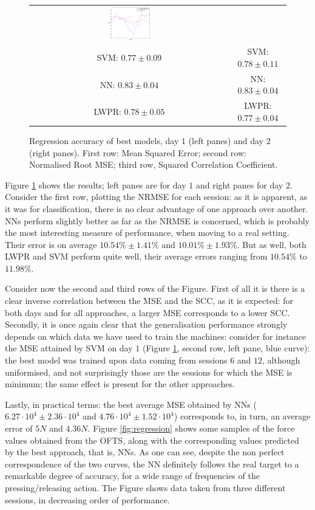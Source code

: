 \begin{figure}[!ht]
\begin{tabular}{cc}
    \includegraphics[width=0.22\textwidth]{figs/fig_SCC_regr_resCrossBestOnDay2} \\
     SVM: $0.77 \pm 0.09$ &  SVM: $0.78 \pm 0.11$ \\
      NN: $0.83 \pm 0.04$ &   NN: $0.83 \pm 0.04$ \\
    LWPR: $0.78 \pm 0.05$ & LWPR: $0.77 \pm 0.04$ \\
  \end{tabular}
  \caption{Regression accuracy of best models, day $1$ (left panes)
    and day $2$ (right panes). First row: Mean Squared Error; second
    row: Normalised Root MSE; third row, Squared Correlation Coefficient.}
  \label{fig:best_regr}
\end{figure}

Figure \ref{fig:best_regr} shows the results; left panes are for day
$1$ and right panes for day $2$. Consider the first row, plotting the
NRMSE for each session: as it is apparent, as it was for
classification, there is no clear advantage of one approach over
another. NNs perform slightly better as far as the NRMSE is concerned,
which is probably the most interesting measure of performance, when
moving to a real setting. Their error is on average $10.54\% \pm
1.41\%$ and $10.01\% \pm 1.93\%$. But as well, both LWPR and SVM
perform quite well, their average errors ranging from $10.54\%$ to
$11.98\%$.

Consider now the second and third rows of the Figure. First of all it
is there is a clear inverse correlation between the MSE and the SCC,
as it is expected: for both days and for all approaches, a larger MSE
corresponds to a lower SCC. Secondly, it is once again clear that the
generalisation performance strongly depends on which data we have used
to train the machines: consider for instance the MSE attained by SVM
on day $1$ (Figure \ref{fig:best_regr}, second row, left pane, blue
curve): the best model was trained upon data coming from sessions $6$
and $12$, although uniformised, and not surprisingly those are the
sessions for which the MSE is minimum; the same effect is present for
the other approaches.

Lastly, in practical terms: the best average MSE obtained by NNs
($6.27\cdot 10^4 \pm 2.36\cdot 10^4$ and $4.76\cdot 10^4 \pm 1.52\cdot
10^4$) corresponds to, in turn, an average error of $5N$ and
$4.36N$. Figure \ref{fig:regression} shows some samples of the force
values obtained from the OFTS, along with the corresponding values
predicted by the best approach, that is, NNs. As one can see, despite
the non perfect correspondence of the two curves, the NN definitely
follows the real target to a remarkable degree of accuracy, for a wide
range of frequencies of the pressing/releasing action. The Figure
shows data taken from three different sessions, in decreasing order of
performance.

